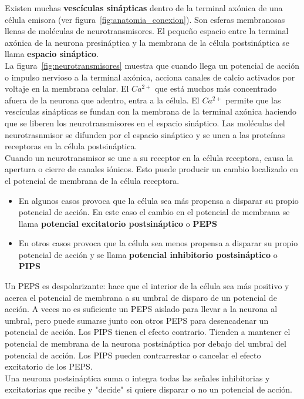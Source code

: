 Existen muchas \textbf{vescículas sinápticas} dentro de la terminal axónica de una célula emisora (ver figura~\ref{fig:anatomia_conexion}). Son esferas membranosas llenas de moléculas de neurotransmisores. El pequeño espacio entre la terminal axónica de la neurona presináptica y la membrana de la célula postsináptica se llama \textbf{espacio sináptico}.\\
La figura~\ref{fig:neurotransmisores} muestra que cuando llega un potencial de acción o impulso nervioso a la terminal axónica, acciona canales de calcio activados por voltaje en la membrana celular. \newpage
El $Ca^{2+}$ que está muchos más concentrado afuera de la neurona que adentro, entra a la célula. El $Ca^{2+}$ permite que las vescículas sinápticas se fundan con la membrana de la terminal axónica haciendo que se liberen los neurotransmisores en el espacio sináptico. Las moléculas del neurotrasnmisor se difunden por el espacio sináptico y se unen a las proteínas receptoras en la célula postsináptica.\\
Cuando un neurotransmisor se une a su receptor en la célula receptora, causa la apertura o cierre de canales iónicos. Esto puede producir un cambio localizado en el potencial de membrana de la célula receptora.
\begin{itemize}
    \item En algunos casos provoca que la célula sea más propensa a disparar su propio potencial de acción. En este caso el cambio en el potencial de membrana se llama \textbf{potencial excitatorio postsináptico} o \textbf{PEPS}
    \item En otros casos provoca que la célula sea menos propensa a disparar su propio potencial de acción y se llama \textbf{potencial inhibitorio postsináptico} o \textbf{PIPS}
\end{itemize}
Un PEPS es despolarizante: hace que el interior de la célula sea más positivo y acerca el potencial de membrana a su umbral de disparo de un potencial de acción. A veces no es suficiente un PEPS aislado para llevar a la neurona al umbral, pero puede sumarse junto con otros PEPS para desencadenar un potencial de acción.
Los PIPS tienen el efecto contrario. Tienden a mantener el potencial de membrana de la neurona postsináptica por debajo del umbral del potencial de acción. Los PIPS pueden contrarrestar o cancelar el efecto excitatorio de los PEPS.\\
Una neurona postsináptica suma o integra todas las señales inhibitorias y excitatorias que recibe y "decide" si quiere disparar o no un potencial de acción.
